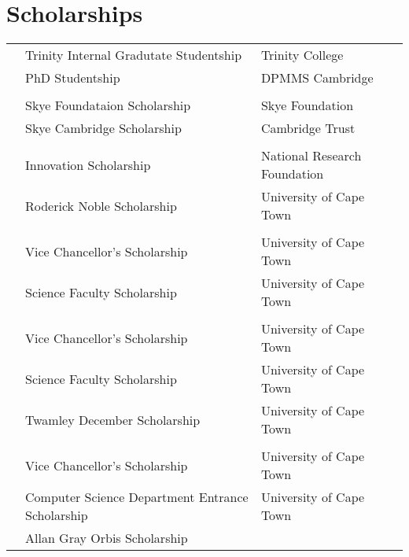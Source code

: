 
\section{Scholarships}

\begin{tabular}{R{2.5cm}|ll}
 & Trinity Internal Gradutate Studentship           & Trinity College              \\
         & PhD Studentship                                  & DPMMS Cambridge              \\
         &                                                  &                              \\
 & Skye Foundataion Scholarship                     & Skye Foundation              \\
         & Skye Cambridge Scholarship                       & Cambridge Trust              \\
         &                                                  &                              \\
 & Innovation Scholarship                           & National Research Foundation \\
         & Roderick Noble Scholarship                       & University of Cape Town      \\
         &                                                  &                              \\
 & Vice Chancellor's Scholarship                    & University of Cape Town      \\
         & Science Faculty Scholarship                      & University of Cape Town      \\
         &                                                  &                              \\
 & Vice Chancellor's Scholarship                    & University of Cape Town      \\
         & Science Faculty Scholarship                      & University of Cape Town      \\
         & Twamley December Scholarship                     & University of Cape Town      \\
         &                                                  &                              \\
 & Vice Chancellor's Scholarship                    & University of Cape Town      \\
         & Computer Science Department Entrance Scholarship & University of Cape Town      \\
         & Allan Gray Orbis Scholarship                     &                              \\
\end{tabular}

